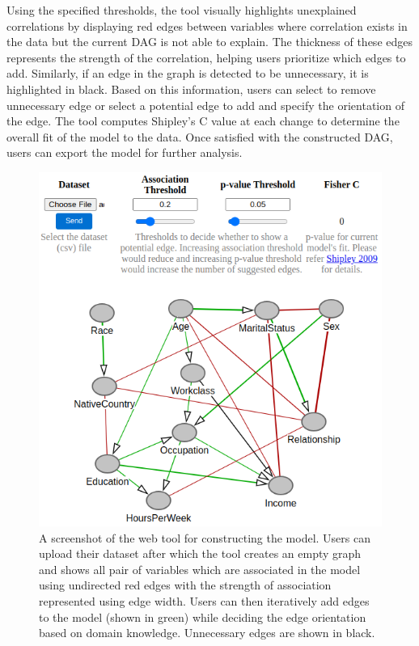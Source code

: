 \documentclass{uai2025} %
\begin{document}
Using the specified thresholds, the tool visually highlights unexplained
correlations by displaying red edges between variables where correlation exists
in the data but the current DAG is not able to explain. The thickness of these
edges represents the strength of the correlation, helping users prioritize
which edges to add. Similarly, if an edge in the graph is detected to be
unnecessary, it is highlighted in black. Based on this information, users can
select to remove unnecessary edge or select a potential edge to add and specify
the orientation of the edge. The tool computes Shipley’s C \citep{Shipley2000}
value at each change to determine the overall fit of the model to the data.
Once satisfied with the constructed DAG, users can export the model for further
analysis.

\begin{figure}[t!]
	\centering
	\includegraphics[scale=0.4]{../code/plots/web_tool_full.png}
	\caption{A screenshot of the web tool for constructing the model. Users
		can upload their dataset after which the tool creates an empty
		graph and shows all pair of variables which are associated in
		the model using undirected red edges with the strength of
		association represented using edge width. Users can then
		iteratively add edges to the model (shown in green) while
		deciding the edge orientation based on domain knowledge.
		Unnecessary edges are shown in black.}
	\label{fig:web}
\end{figure}
\end{document}
